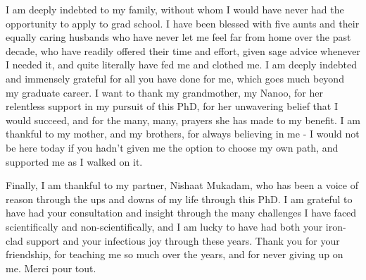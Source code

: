\documentclass{brandeis-dissertation3.12}
\begin{document}
\begin{dissertation-acknowledgements}
I am deeply indebted to my family, without whom I would have never had the opportunity to apply to grad school. I have been blessed with five aunts and their equally caring husbands who have never let me feel far from home over the past decade, who have readily offered their time and effort, given sage advice whenever I needed it, and quite literally have fed me and clothed me. I am deeply indebted and immensely grateful for all you have done for me, which goes much beyond my graduate career. I want to thank my grandmother, my Nanoo, for her relentless support in my pursuit of this PhD, for her unwavering belief that I would succeed, and for the many, many, prayers she has made to my benefit. I am thankful to my mother, and my brothers, for always believing in me - I would not be here today if you hadn’t given me the option to choose my own path, and supported me as I walked on it.

Finally, I am thankful to my partner, Nishaat Mukadam, who has been a voice of reason through the ups and downs of my life through this PhD. I am grateful to have had your consultation and insight through the many challenges I have faced scientifically and non-scientifically, and I am lucky to have had both your iron-clad support and your infectious joy through these years. Thank you for your friendship, for teaching me so much over the years, and for never giving up on me. Merci pour tout.

\end{dissertation-acknowledgements}
\end{document}
